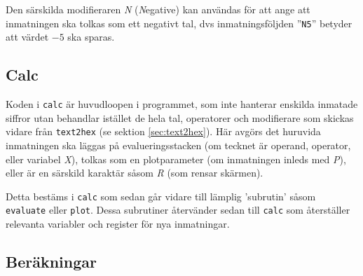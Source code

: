 \documentclass[]{article}
\begin{document}
Den särskilda modifieraren \textit{N} (\textit{N}egative) kan användas för att ange att inmatningen ska tolkas som ett negativt tal, dvs inmatningsföljden ''\texttt{N5}'' betyder att värdet $-5$ ska sparas.

\subsection{Calc}
Koden i \texttt{calc} är huvudloopen i programmet, som inte hanterar enskilda inmatade siffror utan behandlar istället de hela tal, operatorer och modifierare som skickas vidare från \texttt{text2hex} (se sektion \ref{sec:text2hex}). Här avgörs det huruvida inmatningen ska läggas på evalueringsstacken (om tecknet är operand, operator, eller variabel \textit{X}), tolkas som en plotparameter (om inmatningen inleds med \textit{P}), eller är en särskild karaktär såsom \textit{R} (som rensar skärmen).

Detta bestäms i \texttt{calc} som sedan går vidare till lämplig 'subrutin' såsom \texttt{evaluate} eller \texttt{plot}. Dessa subrutiner återvänder sedan till \texttt{calc} som återställer relevanta variabler och register för nya inmatningar.

\subsection{Beräkningar}
\end{document}
